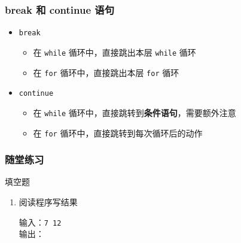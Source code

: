 \begin{frame}[fragile]
    \frametitle{break 和 continue 语句}

    \begin{itemize}
        \item<1-> \lstinline|break|

            \begin{itemize}
                \item 在 \lstinline|while| 循环中，直接跳出本层 \lstinline|while| 循环
                \item 在 \lstinline|for| 循环中，直接跳出本层 \lstinline|for| 循环
            \end{itemize}

        \item<2-> \lstinline|continue|

            \begin{itemize}
                \item 在 \lstinline|while| 循环中，直接跳转到\textbf{条件语句}，需要额外注意
                \item 在 \lstinline|for| 循环中，直接跳转到每次循环后的动作
            \end{itemize}

    \end{itemize}
\end{frame}

\begin{frame}[fragile]
    \frametitle{随堂练习}

    \begin{exampleblock}{填空题}

        \begin{enumerate}
            \item 阅读程序写结果
                

                \vspace{.8ex}
                \small{输入：}\lstinline|7 12|\\
                \small{输出：}
        \end{enumerate}

    \end{exampleblock}
\end{frame}


